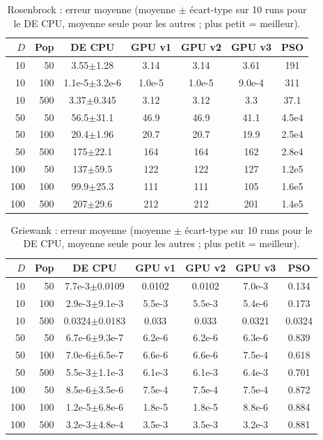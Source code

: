 \begin{table}[!t]\centering\scriptsize\setlength{\tabcolsep}{2pt}\caption{Rosenbrock : erreur moyenne (moyenne $\pm$ \'ecart-type sur 10 runs pour le DE CPU, moyenne seule pour les autres ; plus petit = meilleur).}\label{tab:rosenbrock}
\begin{tabular}{rr|ccccc}\toprule $D$ & Pop & DE CPU & GPU v1 & GPU v2 & GPU v3 & PSO\\\midrule
10 & 50 & 3.55$\pm$1.28 & 3.14 & 3.14 & 3.61 & 191\\
10 & 100 & 1.1e-5$\pm$3.2e-6 & 1.0e-5 & 1.0e-5 & 9.0e-4 & 311\\
10 & 500 & 3.37$\pm$0.345 & 3.12 & 3.12 & 3.3 & 37.1\\
\midrule
50 & 50 & 56.5$\pm$31.1 & 46.9 & 46.9 & 41.1 & 4.5e4\\
50 & 100 & 20.4$\pm$1.96 & 20.7 & 20.7 & 19.9 & 2.5e4\\
50 & 500 & 175$\pm$22.1 & 164 & 164 & 162 & 2.8e4\\
\midrule
100 & 50 & 137$\pm$59.5 & 122 & 122 & 127 & 1.2e5\\
100 & 100 & 99.9$\pm$25.3 & 111 & 111 & 105 & 1.6e5\\
100 & 500 & 207$\pm$29.6 & 212 & 212 & 201 & 1.4e5\\
\bottomrule\end{tabular}\end{table}
\begin{table}[!t]\centering\scriptsize\setlength{\tabcolsep}{2pt}\caption{Griewank : erreur moyenne (moyenne $\pm$ \'ecart-type sur 10 runs pour le DE CPU, moyenne seule pour les autres ; plus petit = meilleur).}\label{tab:griewank}
\begin{tabular}{rr|ccccc}\toprule $D$ & Pop & DE CPU & GPU v1 & GPU v2 & GPU v3 & PSO\\\midrule
10 & 50 & 7.7e-3$\pm$0.0109 & 0.0102 & 0.0102 & 7.0e-3 & 0.134\\
10 & 100 & 2.9e-3$\pm$9.1e-3 & 5.5e-3 & 5.5e-3 & 5.4e-6 & 0.173\\
10 & 500 & 0.0324$\pm$0.0183 & 0.033 & 0.033 & 0.0321 & 0.0324\\
\midrule
50 & 50 & 6.7e-6$\pm$9.3e-7 & 6.2e-6 & 6.2e-6 & 6.3e-6 & 0.839\\
50 & 100 & 7.0e-6$\pm$6.5e-7 & 6.6e-6 & 6.6e-6 & 7.5e-4 & 0.618\\
50 & 500 & 5.5e-3$\pm$1.1e-3 & 6.1e-3 & 6.1e-3 & 6.4e-3 & 0.701\\
\midrule
100 & 50 & 8.5e-6$\pm$3.5e-6 & 7.5e-4 & 7.5e-4 & 7.5e-4 & 0.872\\
100 & 100 & 1.2e-5$\pm$6.8e-6 & 1.8e-5 & 1.8e-5 & 8.8e-6 & 0.884\\
100 & 500 & 3.2e-3$\pm$4.8e-4 & 3.5e-3 & 3.5e-3 & 3.2e-3 & 0.881\\
\bottomrule\end{tabular}\end{table}
